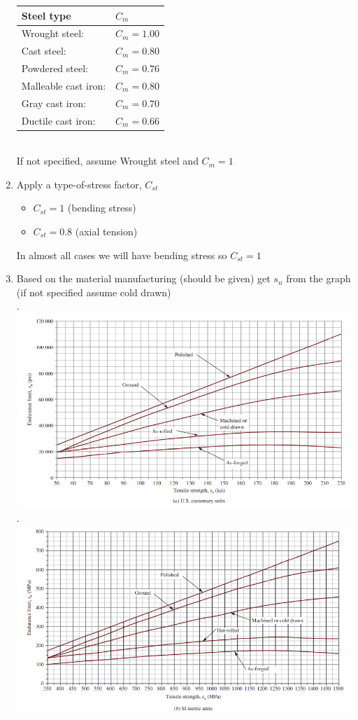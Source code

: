 \documentclass[11pt, fleqn]{article}
\begin{document}
\begin{enumerate}
    \begin{tabular}{ll}
        Steel type & $C_m$\\
        \hline
        Wrought steel: & $C_m=1.00$\\
        Cast steel: & $C_m=0.80$\\
        Powdered steel: & $C_m=0.76$\\
        Malleable cast iron: & $C_m=0.80$\\
        Gray cast iron: & $C_m=0.70$\\
        Ductile cast iron: & $C_m=0.66$
    \end{tabular}\\
    
    If not specified, assume Wrought steel and $C_m=1$
    \item Apply a type-of-stress factor, $C_{st}$
    \begin{itemize}
        \item $C_{st}=1$ (bending stress)
        \item $C_{st}=0.8$ (axial tension)
    \end{itemize}
    In almost all cases we will have bending stress so $C_{st}=1$
    \item Based on the material manufacturing (should be given) get $s_n$ from the graph\\
    (if not specified assume cold drawn)\\
    .\hspace{-1.5cm}\includegraphics[scale=1]{Shafts/Fig5-11.png}\\
    .\hspace{-1.5cm}\includegraphics[scale=1]{Shafts/Fig5-11Metric.png}

\end{enumerate}
\end{document}
